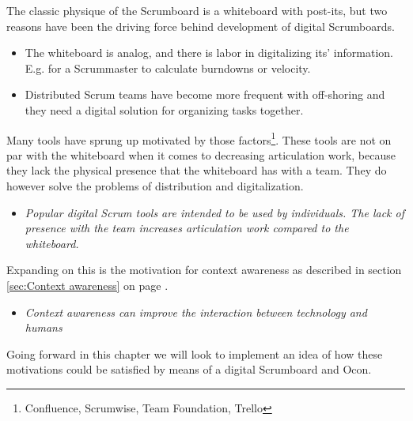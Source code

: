 \documentclass[../report.tex]{subfiles}
\begin{document}
The classic physique of the Scrumboard is a whiteboard with post-its, but two reasons have been the driving force behind development of digital Scrumboards.

\begin{itemize}
\item The whiteboard is analog, and there is labor in digitalizing its' information. E.g. for a Scrummaster to calculate burndowns or velocity.
\item Distributed Scrum teams have become more frequent with off-shoring and they need a digital solution for organizing tasks together.
\end{itemize}

Many tools have sprung up motivated by those factors\footnote{Confluence, Scrumwise, Team Foundation, Trello}. These tools are not on par with the whiteboard when it comes to decreasing articulation work, because they lack the physical presence that the whiteboard has with a team. They do however solve the problems of distribution and digitalization.

\begin{itemize}
\item[\textbf{Motivation 1}] \textit{Popular digital Scrum tools are intended to be used by individuals. The lack of presence with the team increases articulation work compared to the whiteboard.}
\end{itemize}

Expanding on this is the motivation for context awareness as described in section \ref{sec:Context awareness} on page \pageref{sec:Context awareness}.

\begin{itemize}
\item[\textbf{Motivation 2}] \textit{Context awareness can improve the interaction between technology and humans}
\end{itemize}



Going forward in this chapter we will look to implement an idea of how these motivations could be satisfied by means of a digital Scrumboard and Ocon.




\end{document}

